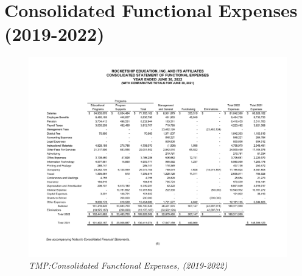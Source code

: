
\chapter{Consolidated Functional Expenses (2019-2022)}\noindent%
\label{ch:consolidated_functional_expenses_2019-2022}


\vspace{-4\baselineskip}

\begin{figure}
  \caption[TMP:Consolidated Functional Expenses (2019–2022)]{\textit{TMP:Consolidated Functional Expenses, (2019-2022)}}%
  \label{fig:consolidated_functional_expenses_2019-2022} %
  \raggedright
  \includegraphics[scale=0.8]{Consolidated_Functional_Expenses_Years_2019-2022} %
\end{figure}


